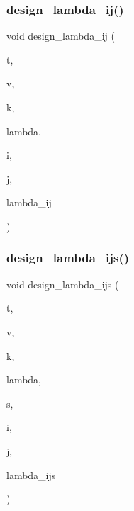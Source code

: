 \subsubsection{\texorpdfstring{design\+\_\+lambda\+\_\+ij()}{design\_lambda\_ij()}}
{\footnotesize\ttfamily void design\+\_\+lambda\+\_\+ij (\begin{DoxyParamCaption}\item[{\mbox{\hyperlink{galois_8h_a09fddde158a3a20bd2dcadb609de11dc}{I\+NT}}}]{t,  }\item[{\mbox{\hyperlink{galois_8h_a09fddde158a3a20bd2dcadb609de11dc}{I\+NT}}}]{v,  }\item[{\mbox{\hyperlink{galois_8h_a09fddde158a3a20bd2dcadb609de11dc}{I\+NT}}}]{k,  }\item[{\mbox{\hyperlink{classdiscreta__base}{discreta\+\_\+base}} \&}]{lambda,  }\item[{\mbox{\hyperlink{galois_8h_a09fddde158a3a20bd2dcadb609de11dc}{I\+NT}}}]{i,  }\item[{\mbox{\hyperlink{galois_8h_a09fddde158a3a20bd2dcadb609de11dc}{I\+NT}}}]{j,  }\item[{\mbox{\hyperlink{classdiscreta__base}{discreta\+\_\+base}} \&}]{lambda\+\_\+ij }\end{DoxyParamCaption})}

\mbox{\label{_l_i_b_2_d_i_s_c_r_e_t_a_2design_8_c_a89f8e89e9ddb69c6871c43b5253363f2}} 
\subsubsection{\texorpdfstring{design\+\_\+lambda\+\_\+ijs()}{design\_lambda\_ijs()}}
{\footnotesize\ttfamily void design\+\_\+lambda\+\_\+ijs (\begin{DoxyParamCaption}\item[{\mbox{\hyperlink{galois_8h_a09fddde158a3a20bd2dcadb609de11dc}{I\+NT}}}]{t,  }\item[{\mbox{\hyperlink{galois_8h_a09fddde158a3a20bd2dcadb609de11dc}{I\+NT}}}]{v,  }\item[{\mbox{\hyperlink{galois_8h_a09fddde158a3a20bd2dcadb609de11dc}{I\+NT}}}]{k,  }\item[{\mbox{\hyperlink{classdiscreta__base}{discreta\+\_\+base}} \&}]{lambda,  }\item[{\mbox{\hyperlink{galois_8h_a09fddde158a3a20bd2dcadb609de11dc}{I\+NT}}}]{s,  }\item[{\mbox{\hyperlink{galois_8h_a09fddde158a3a20bd2dcadb609de11dc}{I\+NT}}}]{i,  }\item[{\mbox{\hyperlink{galois_8h_a09fddde158a3a20bd2dcadb609de11dc}{I\+NT}}}]{j,  }\item[{\mbox{\hyperlink{classdiscreta__base}{discreta\+\_\+base}} \&}]{lambda\+\_\+ijs }\end{DoxyParamCaption})}

